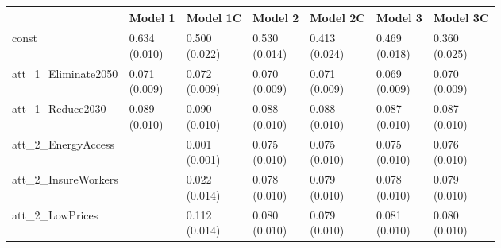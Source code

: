 \begin{tabular}{lllllll}
\toprule
  & Model 1 & Model 1C & Model 2 & Model 2C & Model 3 & Model 3C \\
\midrule
const & \makecell{ 0.634 \\ (0.010) } & \makecell{ 0.500 \\ (0.022) } & \makecell{ 0.530 \\ (0.014) } & \makecell{ 0.413 \\ (0.024) } & \makecell{ 0.469 \\ (0.018) } & \makecell{ 0.360 \\ (0.025) } \\
att_1_Eliminate2050 & \makecell{ 0.071 \\ (0.009) } & \makecell{ 0.072 \\ (0.009) } & \makecell{ 0.070 \\ (0.009) } & \makecell{ 0.071 \\ (0.009) } & \makecell{ 0.069 \\ (0.009) } & \makecell{ 0.070 \\ (0.009) } \\
att_1_Reduce2030 & \makecell{ 0.089 \\ (0.010) } & \makecell{ 0.090 \\ (0.010) } & \makecell{ 0.088 \\ (0.010) } & \makecell{ 0.088 \\ (0.010) } & \makecell{ 0.087 \\ (0.010) } & \makecell{ 0.087 \\ (0.010) } \\
att_2_EnergyAccess &   & \makecell{ 0.001 \\ (0.001) } & \makecell{ 0.075 \\ (0.010) } & \makecell{ 0.075 \\ (0.010) } & \makecell{ 0.075 \\ (0.010) } & \makecell{ 0.076 \\ (0.010) } \\
att_2_InsureWorkers &   & \makecell{ 0.022 \\ (0.014) } & \makecell{ 0.078 \\ (0.010) } & \makecell{ 0.079 \\ (0.010) } & \makecell{ 0.078 \\ (0.010) } & \makecell{ 0.079 \\ (0.010) } \\
att_2_LowPrices &   & \makecell{ 0.112 \\ (0.014) } & \makecell{ 0.080 \\ (0.010) } & \makecell{ 0.079 \\ (0.010) } & \makecell{ 0.081 \\ (0.010) } & \makecell{ 0.080 \\ (0.010) } \\

\end{tabular}
